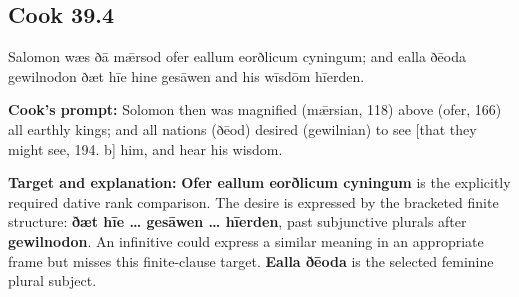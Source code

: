 \par\begin{minipage}{\linewidth}\raggedright
\subsection*{Cook 39.4}

Salomon wæs ðā mǣrsod ofer eallum eorðlicum cyningum; and ealla ðēoda gewilnodon ðæt hīe hine gesāwen and his wīsdōm hīerden.

\textbf{Cook's prompt:} Solomon then was magnified (mǣrsian, 118) above (ofer, 166) all earthly kings; and all nations (ðēod) desired (gewilnian) to see [that they might see, 194. b] him, and hear his wisdom.

\textbf{Target and explanation:} \textbf{Ofer eallum eorðlicum cyningum} is the explicitly required dative rank comparison. The desire is expressed by the bracketed finite structure: \textbf{ðæt hīe … gesāwen … hīerden}, past subjunctive plurals after \textbf{gewilnodon}. An infinitive could express a similar meaning in an appropriate frame but misses this finite-clause target. \textbf{Ealla ðēoda} is the selected feminine plural subject.

\end{minipage}\par\addvspace{4pt}

